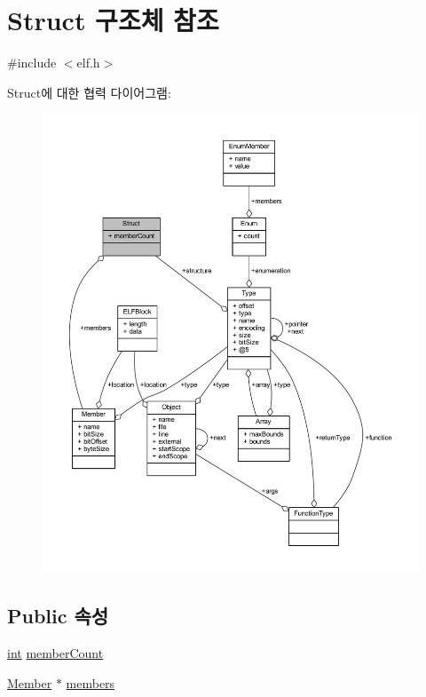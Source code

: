 \hypertarget{struct_struct}{}\section{Struct 구조체 참조}
\label{struct_struct}


{\ttfamily \#include $<$elf.\+h$>$}



Struct에 대한 협력 다이어그램\+:\nopagebreak
\begin{figure}[H]
\begin{center}
\leavevmode
\includegraphics[width=350pt]{struct_struct__coll__graph}
\end{center}
\end{figure}
\subsection*{Public 속성}
\begin{DoxyCompactItemize}
\item 
\mbox{\hyperlink{_util_8cpp_a0ef32aa8672df19503a49fab2d0c8071}{int}} \mbox{\hyperlink{struct_struct_a3dc20c2c1073675cfd036ae35d63d0ff}{member\+Count}}
\item 
\mbox{\hyperlink{struct_member}{Member}} $\ast$ \mbox{\hyperlink{struct_struct_aecffaae8752f8d8f85c33d5b05d29d2e}{members}}
\end{DoxyCompactItemize}


